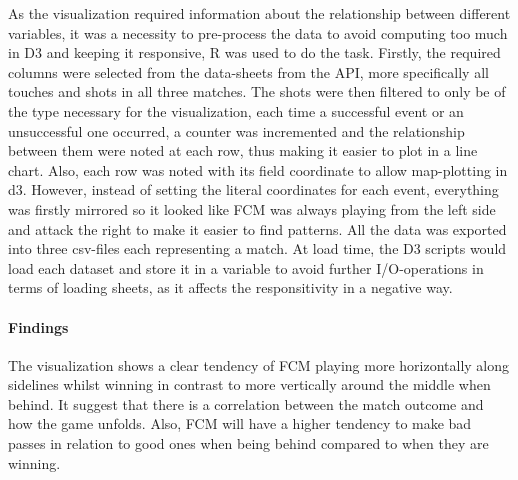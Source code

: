 \documentclass[Report.tex]{subfiles}
\begin{document}
As the visualization required information about the relationship between different variables, it was a necessity to pre-process the data to avoid computing too much in D3 and keeping it responsive, R was used to do the task. Firstly, the required columns were selected from the data-sheets from the API, more specifically all touches and shots in all three matches. The shots were then filtered to only be of the type necessary for the visualization, each time a successful event or an unsuccessful one occurred, a counter was incremented and the relationship between them were noted at each row, thus making it easier to plot in a line chart. Also, each row was noted with its field coordinate to allow map-plotting in d3. However, instead of setting the literal coordinates for each event, everything was firstly mirrored so it looked like FCM was always playing from the left side and attack the right to make it easier to find patterns. All the data was exported into three csv-files each representing a match. At load time, the D3 scripts would load each dataset and store it in a variable to avoid further I/O-operations in terms of loading sheets, as it affects the responsitivity in a negative way. 

\paragraph{Findings \\}
The visualization shows a clear tendency of FCM playing more horizontally along sidelines whilst winning in contrast to more vertically around the middle when behind. It suggest that there is a correlation between the match outcome and how the game unfolds. Also, FCM will have a higher tendency to make bad passes in relation to good ones when being behind compared to when they are winning.
	
\end{document}
